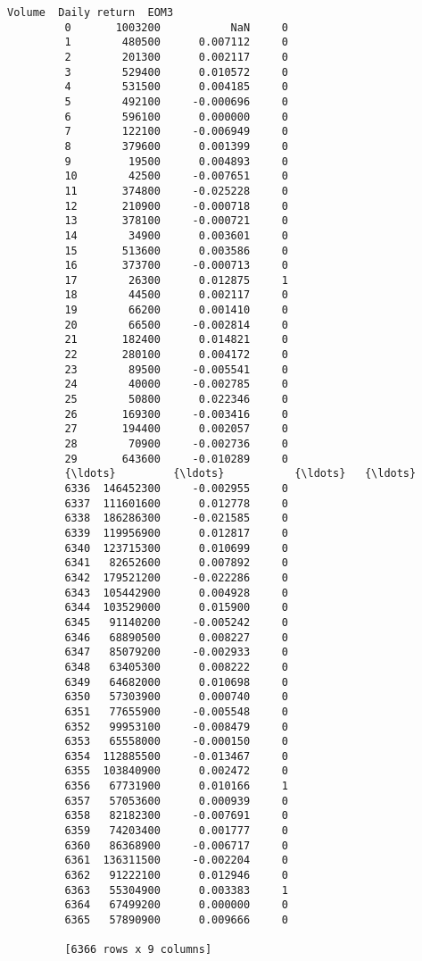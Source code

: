 \documentclass[11pt]{article}
\begin{document}
\begin{Verbatim}[commandchars=\\\{\}]
                  Volume  Daily return  EOM3  
         0       1003200           NaN     0  
         1        480500      0.007112     0  
         2        201300      0.002117     0  
         3        529400      0.010572     0  
         4        531500      0.004185     0  
         5        492100     -0.000696     0  
         6        596100      0.000000     0  
         7        122100     -0.006949     0  
         8        379600      0.001399     0  
         9         19500      0.004893     0  
         10        42500     -0.007651     0  
         11       374800     -0.025228     0  
         12       210900     -0.000718     0  
         13       378100     -0.000721     0  
         14        34900      0.003601     0  
         15       513600      0.003586     0  
         16       373700     -0.000713     0  
         17        26300      0.012875     1  
         18        44500      0.002117     0  
         19        66200      0.001410     0  
         20        66500     -0.002814     0  
         21       182400      0.014821     0  
         22       280100      0.004172     0  
         23        89500     -0.005541     0  
         24        40000     -0.002785     0  
         25        50800      0.022346     0  
         26       169300     -0.003416     0  
         27       194400      0.002057     0  
         28        70900     -0.002736     0  
         29       643600     -0.010289     0  
         {\ldots}         {\ldots}           {\ldots}   {\ldots}  
         6336  146452300     -0.002955     0  
         6337  111601600      0.012778     0  
         6338  186286300     -0.021585     0  
         6339  119956900      0.012817     0  
         6340  123715300      0.010699     0  
         6341   82652600      0.007892     0  
         6342  179521200     -0.022286     0  
         6343  105442900      0.004928     0  
         6344  103529000      0.015900     0  
         6345   91140200     -0.005242     0  
         6346   68890500      0.008227     0  
         6347   85079200     -0.002933     0  
         6348   63405300      0.008222     0  
         6349   64682000      0.010698     0  
         6350   57303900      0.000740     0  
         6351   77655900     -0.005548     0  
         6352   99953100     -0.008479     0  
         6353   65558000     -0.000150     0  
         6354  112885500     -0.013467     0  
         6355  103840900      0.002472     0  
         6356   67731900      0.010166     1  
         6357   57053600      0.000939     0  
         6358   82182300     -0.007691     0  
         6359   74203400      0.001777     0  
         6360   86368900     -0.006717     0  
         6361  136311500     -0.002204     0  
         6362   91222100      0.012946     0  
         6363   55304900      0.003383     1  
         6364   67499200      0.000000     0  
         6365   57890900      0.009666     0  
         
         [6366 rows x 9 columns]
\end{Verbatim}
            
\end{document}
